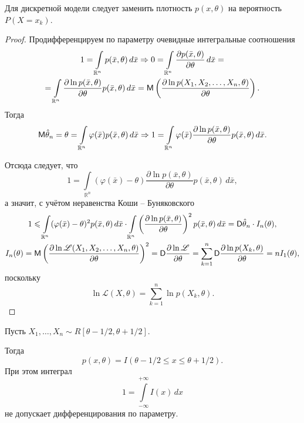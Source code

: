 \begin{remark*}
	Для дискретной модели следует заменить плотность $ p(x,\theta) $ на
	вероятность $ P(X = x_k) $.
\begin{proof}
	Продифференцируем по параметру очевидные интегральные соотношения
	\begin{multline*}
		1 = \int\limits_{\mathbb R^n} p(\bar x, \theta) \, d\bar x \Rightarrow 0 =
		\int\limits_{\mathbb R^n} \frac{\partial p(\bar x, \theta)}{\partial\theta} \,
		d\bar x = \\ = \int\limits_{\mathbb R^n} \frac{\partial \ln p(\bar x,
		\theta)}{\partial\theta} p(\bar x, \theta) \, d\bar x = \mathsf M \left( \frac{\partial
		\ln p(X_1, X_2, \ldots, X_n, \theta)}{\partial \theta} \right).
	\end{multline*}
	Тогда
	\[
		\mathsf M \hat\theta_n = \theta = \int\limits_{\mathbb R^n} \varphi(\bar x)
		p(\bar x, \theta) \, d\bar x \Rightarrow 1 = \int\limits_{\mathbb R^n}
		\varphi(\bar x) \frac{\partial \ln
		p(\bar x, \theta)}{\partial\theta} p(\bar x, \theta) \, d\bar x.
	\]

	Отсюда следует, что
	\[
		1 = \int\limits_{\mathbb R^n} (\varphi(\bar x)-\theta) \frac{\partial \ln
		p(\bar x, \theta)}{\partial
		\theta} p(\bar x, \theta) \, d\bar x,
	\]
а значит, с учётом неравенства Коши -- Буняковского
		\begin{gather*}
		1 \leqslant \int\limits_{\mathbb R^n} (\varphi(\bar x) - \theta)^2 p(\bar x,
		\theta) \, d\bar x \cdot
		\int\limits_{\mathbb R^n} \left(\frac{\partial\ln p(\bar x,
		\theta)}{\partial\theta}\right)^2 p(\bar x, \theta)
		\, d\bar x = \mathsf D \hat \theta_n \cdot I_n(\theta),\\
		I_n(\theta) = \mathsf M \left(\frac{\partial\ln \mathscr L(X_1, X_2, \dots, X_n,
		\theta)}{\partial\theta}\right)^2 = \mathsf D \frac{\partial \ln \mathscr L}{\partial\theta}
		= \sum_{k=1}^n \mathsf D\frac{\partial \ln p(X_k, \theta)}{\partial\theta} = n
		I_1(\theta),
	\end{gather*}
	поскольку
	\[
		\ln \mathscr L(X, \theta) = \sum_{k=1}^n \ln p(X_k, \theta).
	\]
\end{proof}

\begin{ex}
  Пусть $X_1, \dots, X_n \sim R[\theta-1/2, \theta+1/2]$.

	Тогда
	\[
		p(x, \theta) = I(\theta-1/2 \leqslant x \leqslant \theta+1/2).
	\]
При этом интеграл
\[
	1 = \int\limits_{-\infty}^{+\infty} I(x) \, dx
\]
не допускает дифференцирования по параметру.
\end{ex}


\end{remark*}
